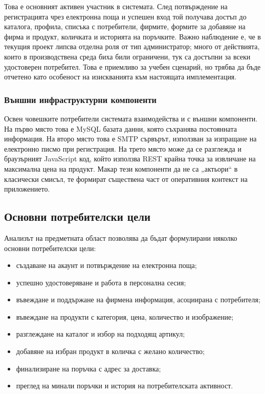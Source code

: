 Това е основният активен участник в системата. След потвърждение на регистрацията чрез електронна поща и успешен вход той получава достъп до каталога, профила, списъка с потребители, фирмите, формите за добавяне на фирма и продукт, количката и историята на поръчките. Важно наблюдение е, че в текущия проект липсва отделна роля от тип администратор; много от действията, които в производствена среда биха били ограничени, тук са достъпни за всеки удостоверен потребител. Това е приемливо за учебен сценарий, но трябва да бъде отчетено като особеност на изискванията към настоящата имплементация.

\subsubsection{Външни инфраструктурни компоненти}

Освен човешките потребители системата взаимодейства и с външни компоненти. На първо място това е MySQL базата данни, която съхранява постоянната информация. На второ място това е SMTP сървърът, използван за изпращане на електронно писмо при регистрация. На трето място може да се разглежда и браузърният JavaScript код, който използва REST крайна точка за извличане на максимална цена на продукт. Макар тези компоненти да не са „актьори“ в класически смисъл, те формират съществена част от оперативния контекст на приложението.

\subsection{Основни потребителски цели}

Анализът на предметната област позволява да бъдат формулирани няколко основни потребителски цели:

\begin{itemize}[leftmargin=*]
    \item създаване на акаунт и потвърждение на електронна поща;
    \item успешно удостоверяване и работа в персонална сесия;
    \item въвеждане и поддържане на фирмена информация, асоциирана с потребителя;
    \item въвеждане на продукти с категория, цена, количество и изображение;
    \item разглеждане на каталог и избор на подходящ артикул;
    \item добавяне на избран продукт в количка с желано количество;
    \item финализиране на поръчка с адрес за доставка;
    \item преглед на минали поръчки и история на потребителската активност.
\end{itemize}

